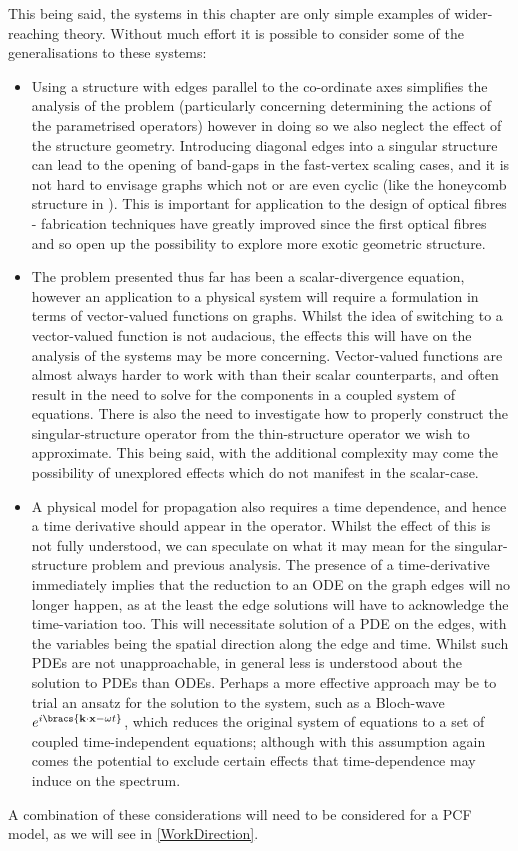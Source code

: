 This being said, the systems in this chapter are only simple examples of wider-reaching theory.
Without much effort it is possible to consider some of the generalisations to these systems:
\begin{itemize}
	\item Using a structure with edges parallel to the co-ordinate axes simplifies the analysis of the problem (particularly concerning determining the actions of the parametrised operators) however in doing so we also neglect the effect of the structure geometry.
	Introducing diagonal edges into a singular structure can lead to the opening of band-gaps in the fast-vertex scaling cases, and it is not hard to envisage graphs which not  or are even cyclic (like the honeycomb structure in ).
	This is important for application to the design of optical fibres - fabrication techniques have greatly improved since the first optical fibres and so open up the possibility to explore more exotic geometric structure.
	\item The problem presented thus far has been a scalar-divergence equation, however an application to a physical system will require a formulation in terms of vector-valued functions on graphs.
	Whilst the idea of switching to a vector-valued function is not audacious, the effects this will have on the analysis of the systems may be more concerning.
	Vector-valued functions are almost always harder to work with than their scalar counterparts, and often result in the need to solve for the components in a coupled system of equations.
	There is also the need to investigate how to properly construct the singular-structure operator from the thin-structure operator we wish to approximate.
	This being said, with the additional complexity may come the possibility of unexplored effects which do not manifest in the scalar-case.
	\item A physical model for propagation also requires a time dependence, and hence a time derivative should appear in the operator.
	Whilst the effect of this is not fully understood, we can speculate on what it may mean for the singular-structure problem and previous analysis.
	The presence of a time-derivative immediately implies that the reduction to an ODE on the graph edges will no longer happen, as at the least the edge solutions will have to acknowledge the time-variation too.
	This will necessitate solution of a PDE on the edges, with the variables being the spatial direction along the edge and time.
	Whilst such PDEs are not unapproachable, in general less is understood about the solution to PDEs than ODEs.
	Perhaps a more effective approach may be to trial an ansatz for the solution to the system, such as a Bloch-wave $e^{i\bracs{\mathbf{k}\cdot\mathbf{x}-\omega t}}$, which reduces the original system of equations to a set of coupled time-independent equations; although with this assumption again comes the potential to exclude certain effects that time-dependence may induce on the spectrum.
\end{itemize}
A combination of these considerations will need to be considered for a PCF model, as we will see in \cref{WorkDirection}.